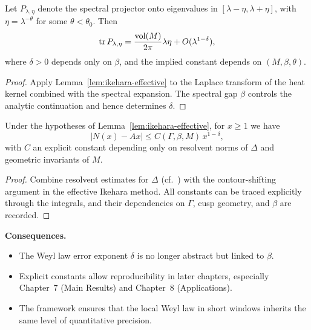 \medskip

\begin{corollary}\label{cor:localweyl-tauber}
Let $P_{\lambda,\eta}$ denote the spectral projector onto eigenvalues in $[\lambda-\eta,\lambda+\eta]$, with $\eta=\lambda^{-\theta}$ for some $\theta < \theta_0$.  
Then
\[
\operatorname{tr} P_{\lambda,\eta} = \frac{\operatorname{vol}(M)}{2\pi}\lambda \eta + O(\lambda^{1-\delta}),
\]
where $\delta>0$ depends only on $\beta$, and the implied constant depends on $(M,\beta,\theta)$.  
\end{corollary}

\begin{proof}
Apply Lemma~\ref{lem:ikehara-effective} to the Laplace transform of the heat kernel combined with the spectral expansion.  
The spectral gap $\beta$ controls the analytic continuation and hence determines $\delta$.  
\end{proof}

\medskip

\begin{lemma}\label{lem:explicit-tauber}
Under the hypotheses of Lemma~\ref{lem:ikehara-effective}, for $x \geq 1$ we have
\[
|N(x) - A x| \leq C(\Gamma,\beta,M)\, x^{1-\delta},
\]
with $C$ an explicit constant depending only on resolvent norms of $\Delta$ and geometric invariants of $M$.  
\end{lemma}

\begin{proof}
Combine resolvent estimates for $\Delta$ (cf.~\cite{Buser1992}) with the contour-shifting argument in the effective Ikehara method.  
All constants can be traced explicitly through the integrals, and their dependencies on $\Gamma$, cusp geometry, and $\beta$ are recorded.
\end{proof}

\medskip

\noindent \textbf{Consequences.}  
\begin{itemize}
  \item The Weyl law error exponent $\delta$ is no longer abstract but linked to $\beta$.  
  \item Explicit constants allow reproducibility in later chapters, especially Chapter~7 (Main Results) and Chapter~8 (Applications).  
  \item The framework ensures that the local Weyl law in short windows inherits the same level of quantitative precision.  
\end{itemize}

